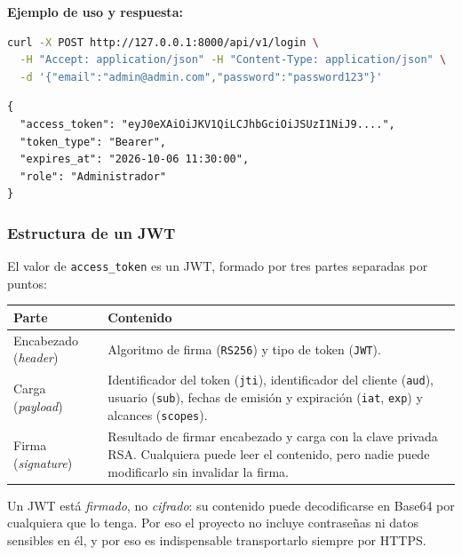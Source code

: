 \textbf{Ejemplo de uso y respuesta:}
\begin{lstlisting}[language=bash, caption={Login y obtención del token}]
curl -X POST http://127.0.0.1:8000/api/v1/login \
  -H "Accept: application/json" -H "Content-Type: application/json" \
  -d '{"email":"admin@admin.com","password":"password123"}'
\end{lstlisting}

\begin{lstlisting}[language={}, caption={Respuesta esperada (200)}]
{
  "access_token": "eyJ0eXAiOiJKV1QiLCJhbGciOiJSUzI1NiJ9....",
  "token_type": "Bearer",
  "expires_at": "2026-10-06 11:30:00",
  "role": "Administrador"
}
\end{lstlisting}

\subsubsection{Estructura de un JWT}
El valor de \texttt{access\_token} es un JWT, formado por tres partes separadas por puntos:
\begin{longtable}{p{3cm}p{12cm}}
\toprule
\textbf{Parte} & \textbf{Contenido} \\
\midrule
\endhead
Encabezado (\emph{header}) & Algoritmo de firma (\texttt{RS256}) y tipo de token (\texttt{JWT}). \\
Carga (\emph{payload}) & Identificador del token (\texttt{jti}), identificador del cliente (\texttt{aud}), usuario (\texttt{sub}), fechas de emisión y expiración (\texttt{iat}, \texttt{exp}) y alcances (\texttt{scopes}). \\
Firma (\emph{signature}) & Resultado de firmar encabezado y carga con la clave privada RSA. Cualquiera puede leer el contenido, pero nadie puede modificarlo sin invalidar la firma. \\
\bottomrule
\end{longtable}

\begin{aviso}
Un JWT está \emph{firmado}, no \emph{cifrado}: su contenido puede decodificarse en Base64 por cualquiera que lo tenga. Por eso el proyecto no incluye contraseñas ni datos sensibles en él, y por eso es indispensable transportarlo siempre por HTTPS.
\end{aviso}

